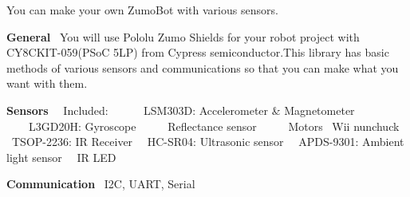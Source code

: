 You can make your own Zumo\+Bot with various sensors. ~\newline
 

{\bfseries General}~\newline
 You will use Pololu Zumo Shields for your robot project with C\+Y8\+C\+K\+I\+T-\/059(P\+SoC 5\+LP) from Cypress semiconductor.\+This library has basic methods of various sensors and communications so that you can make what you want with them. ~\newline
~\newline
~\newline
 

{\bfseries Sensors}~\newline
 ~Included\+: ~\newline
 ~~~~L\+S\+M303D\+: Accelerometer \& Magnetometer~\newline
 ~~~~L3\+G\+D20H\+: Gyroscope~\newline
 ~~~~Reflectance sensor~\newline
 ~~~~Motors ~Wii nunchuck~\newline
 ~T\+S\+O\+P-\/2236\+: IR Receiver~\newline
 ~H\+C-\/\+S\+R04\+: Ultrasonic sensor~\newline
 ~A\+P\+D\+S-\/9301\+: Ambient light sensor~\newline
 ~IR L\+ED ~\newline
~\newline
~\newline
 

{\bfseries Communication}~\newline
 I2C, U\+A\+RT, Serial~\newline
 